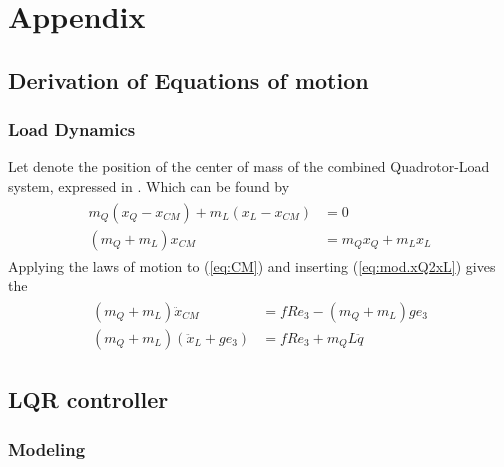 \chapter{Appendix}

\section{Derivation of Equations of motion}
\subsection{Load Dynamics}\label{sec.app:loaddyn}

Let  denote the position of the center of mass of the combined Quadrotor-Load system, expressed in \IF. Which can be found by
\begin{align}\label{eq:CM}
\begin{split}
m_Q(x_Q-x_{CM})+m_L(x_L-x_{CM})&=0\\
(m_Q+m_L)x_{CM}&=m_Qx_Q+m_Lx_L
\end{split}
\end{align}
Applying the laws of motion to (\ref{eq:CM}) and inserting (\ref{eq:mod.xQ2xL}) gives the 
\begin{align}\label{key}
\begin{split}
(m_Q+m_L)\ddot{x}_{CM}&=fRe_3 - (m_Q+m_L)ge_3\\
(m_Q+m_L)(\ddot{x}_L+ge_3)&= fRe_3+m_QL\ddot{q}
\end{split}
\end{align}



\section{LQR controller}\label{app:lqr}

\subsection{Modeling}
%

